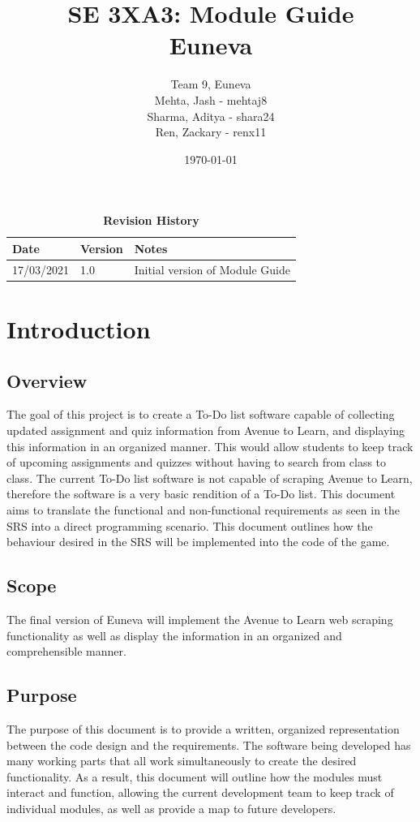 \documentclass[12pt, titlepage]{article}
\title{SE 3XA3: Module Guide\\Euneva}
\author{Team 9, Euneva
		\\ Mehta, Jash - mehtaj8
		\\ Sharma, Aditya - shara24
		\\ Ren, Zackary - renx11
}
\date{\today}
\begin{document}
\maketitle

\tableofcontents
\listoftables
\listoffigures

\begin{table}[bp]
\begin{tabularx}{\textwidth}{p{3cm}p{2cm}X}
\toprule {\bf Date} & {\bf Version} & {\bf Notes}\\
\midrule
17/03/2021 & 1.0 & Initial version of Module Guide\\
\bottomrule
\end{tabularx}
\caption{\bf Revision History}
\end{table}

\newpage


\section{Introduction}

\subsection{Overview}
The goal of this project is to create a To-Do list software capable of collecting updated assignment and quiz information from Avenue to Learn, and displaying this information in an organized manner. This would allow students to keep track of upcoming assignments and quizzes without having to search from class to class. The current To-Do list software is not capable of scraping Avenue to Learn, therefore the software is a very basic rendition of a To-Do list. This document aims to translate the functional and non-functional requirements as seen in the SRS into a direct programming scenario. This document outlines how the behaviour desired in the SRS will be implemented into the code of the game.

\subsection{Scope}
The final version of Euneva will implement the Avenue to Learn web scraping functionality as well as display the information in an organized and comprehensible manner.

\subsection{Purpose}
The purpose of this document is to provide a written, organized representation between the code design and the requirements. The software being developed has many working parts that all work simultaneously to create the desired functionality. As a result, this document will outline how the modules must interact and function, allowing the current development team to keep track of individual modules, as well as provide a map to future developers.
\end{document}
